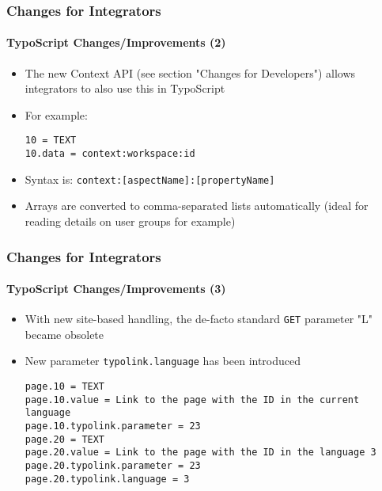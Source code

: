 
\begin{frame}[fragile]
	\frametitle{Changes for Integrators}
	\framesubtitle{TypoScript Changes/Improvements (2)}

	\lstset{basicstyle=\smaller\ttfamily}

	\begin{itemize}
		\item The new Context API (see section "Changes for Developers")
			allows integrators to also use this in TypoScript

		\item For example:

			\begin{lstlisting}
10 = TEXT
10.data = context:workspace:id
			\end{lstlisting}

		\item Syntax is: \texttt{context:[aspectName]:[propertyName]}

		\item Arrays are converted to comma-separated lists automatically\newline
			\smaller(ideal for reading details on user groups for example)\normalsize

	\end{itemize}

\end{frame}


\begin{frame}[fragile]
	\frametitle{Changes for Integrators}
	\framesubtitle{TypoScript Changes/Improvements (3)}

	\lstset{basicstyle=\smaller\ttfamily}

	\begin{itemize}
		\item With new site-based handling, the de-facto standard \texttt{GET}
			parameter "L" became obsolete
		\item New parameter \texttt{typolink.language} has been introduced

			\begin{lstlisting}
page.10 = TEXT
page.10.value = Link to the page with the ID in the current language
page.10.typolink.parameter = 23
page.20 = TEXT
page.20.value = Link to the page with the ID in the language 3
page.20.typolink.parameter = 23
page.20.typolink.language = 3
			\end{lstlisting}

	\end{itemize}

\end{frame}

